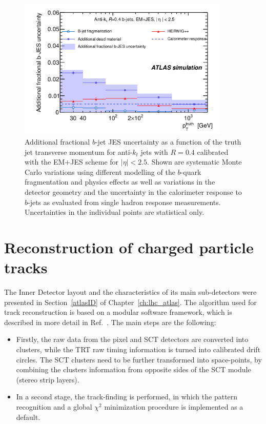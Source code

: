 \begin{figure}[htbp]
  \begin{center}
      \includegraphics[width=0.9\textwidth]{bjetsJESUncertainty.png}
    \caption{Additional fractional $b$-jet JES uncertainty as a function of the truth jet transverse momentum for anti-$k_t$ jets with $R=0.4$ calibrated with the EM+JES scheme for $|\eta| < 2.5$. Shown are systematic Monte Carlo variations using different modelling of the $b$-quark fragmentation and physics effects as well as variations in the detector geometry and the uncertainty in the calorimeter response to $b$-jets as evaluated from single hadron response measurements.  Uncertainties in the individual points are statistical only. }
    \label{fig:bjetJESuncertainty}
  \end{center}
\end{figure}


\section{Reconstruction of charged particle tracks}\label{sec:trackreco}

The Inner Detector layout and the characteristics of its main sub-detectors were presented in Section~\ref{atlasID} of Chapter~\ref{ch:lhc_atlas}. The algorithm used for track reconstruction is based on a modular software framework, which is described in more detail in Ref.~\cite{Cornelissen:1020106}. The main steps are the following:

\begin{itemize}
\item
Firstly, the raw data from the pixel and SCT detectors are converted into clusters, while the TRT raw timing information is turned into calibrated drift circles. The SCT clusters need to be further transformed into space-points, by combining the clusters information from opposite sides of the SCT module (stereo strip layers).
\item
In a second stage, the track-finding is performed, in which the pattern recognition and a global $\chi^2$ minimization procedure is implemented as a default.
\end{itemize}

